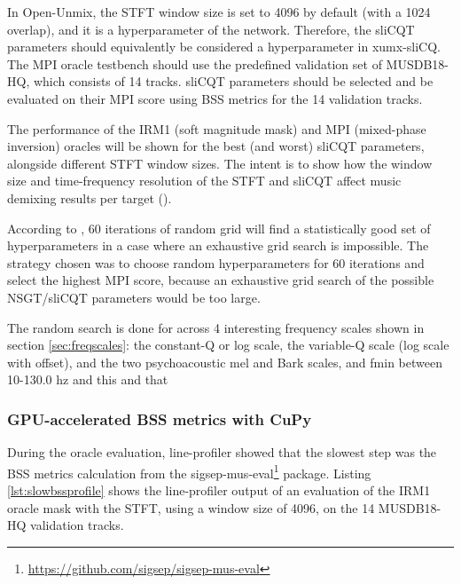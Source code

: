\documentclass[report.tex]{subfiles}
\begin{document}
In Open-Unmix, the STFT window size is set to 4096 by default (with a 1024 overlap), and it is a hyperparameter of the network. Therefore, the sliCQT parameters should equivalently be considered a hyperparameter in xumx-sliCQ. The MPI oracle testbench should use the predefined validation set of MUSDB18-HQ, which consists of 14 tracks. sliCQT parameters should be selected and be evaluated on their MPI score using BSS metrics for the 14 validation tracks.

The performance of the IRM1 (soft magnitude mask) and MPI (mixed-phase inversion) oracles will be shown for the best (and worst) sliCQT parameters, alongside different STFT window sizes. The intent is to show how the window size and time-frequency resolution of the STFT and sliCQT affect music demixing results per target (\cite{tftradeoff1}).

According to \textcite{randomgrid}, 60 iterations of random grid will find a statistically good set of hyperparameters in a case where an exhaustive grid search is impossible. The strategy chosen was to choose random hyperparameters for 60 iterations and select the highest MPI score, because an exhaustive grid search of the possible NSGT/sliCQT parameters would be too large. 

The random search is done for across 4 interesting frequency scales shown in section \ref{sec:freqscales}: the constant-Q or log scale, the variable-Q scale (log scale with offset), and the two psychoacoustic mel and Bark scales, and fmin between 10-130.0 hz and this and that


\subsubsection{GPU-accelerated BSS metrics with CuPy}

During the oracle evaluation, line-profiler showed that the slowest step was the BSS metrics calculation from the sigsep-mus-eval\footnote{\url{https://github.com/sigsep/sigsep-mus-eval}} package. Listing \ref{lst:slowbssprofile} shows the line-profiler output of an evaluation of the IRM1 oracle mask with the STFT, using a window size of 4096, on the 14 MUSDB18-HQ validation tracks.

\end{document}
